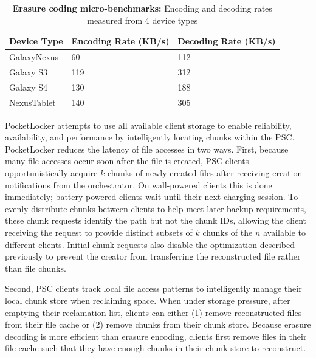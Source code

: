 \begin{table}[t]
{\small

\begin{tabularx}{\columnwidth}{XXX}

\textbf{Device Type} & \textbf{Encoding Rate (KB/s)} & \textbf{Decoding Rate (KB/s)}
\\ \toprule
GalaxyNexus & 60 & 112  \\
Galaxy S3 & 119 & 312  \\
Galaxy S4 & 130 & 188  \\
NexusTablet & 140 & 305  \\

\end{tabularx}
}

\caption{\small \textbf{Erasure coding micro-benchmarks:}
Encoding and decoding rates measured from 4 device types}

\label{tab:coding-perf}

\end{table}


PocketLocker attempts to use all available client storage to enable
reliability, availability, and performance by intelligently locating chunks
within the PSC. PocketLocker reduces the latency of file accesses in two
ways. First, because many file accesses occur soon after the file is created,
PSC clients opportunistically acquire $k$ chunks of newly created files after
receiving creation notifications from the orchestrator. On wall-powered
clients this is done immediately; battery-powered clients wait until their
next charging session. To evenly distribute chunks between clients to help
meet later backup requirements, these chunk requests identify the path but
not the chunk IDs, allowing the client receiving the request to provide
distinct subsets of $k$ chunks of the $n$ available to different clients.
Initial chunk requests also disable the optimization described previously to
prevent the creator from transferring the reconstructed file rather than file
chunks.

Second, PSC clients track local file access patterns to intelligently manage
their local chunk store when reclaiming space. When under storage pressure,
after emptying their reclamation list, clients can either (1) remove
reconstructed files from their file cache or (2) remove chunks from their
chunk store. Because erasure decoding is more efficient than erasure
encoding, clients first remove files in their file cache such that they have
enough chunks in their chunk store to reconstruct.


